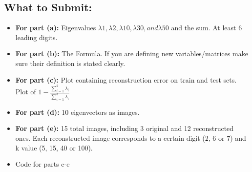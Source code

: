 \documentclass{article}
\begin{document}
\begin{aprob}
\begin{enumerate}
\end{enumerate}
 \subsection*{What to Submit:}
    \begin{itemize}

        \item \textbf{For part (a):} Eigenvalues $\lambda1, \lambda2, \lambda10, \lambda30, and \lambda50$ and the sum. At least 6 leading digits.
        \item \textbf{For part (b):} The Formula. If you are defining new variables/matrices make sure their definition is stated
        clearly.
        \item \textbf{For part (c):} Plot containing reconstruction error on train and test sets. Plot of $1-\frac{\sum_{i=1}^{k}{\lambda_i}}{\sum_{i=1}^{d}{\lambda_i}}$
        \item \textbf{For part (d):} 10 eigenvectors as images.
        \item \textbf{For part (e):} 15 total images, including 3 original and 12 reconstructed ones. Each reconstructed image
        corresponds to a certain digit (2, 6 or 7) and k value (5, 15, 40 or 100).
        \item Code for parts c-e
    \end{itemize}
\end{aprob}
\end{document}
